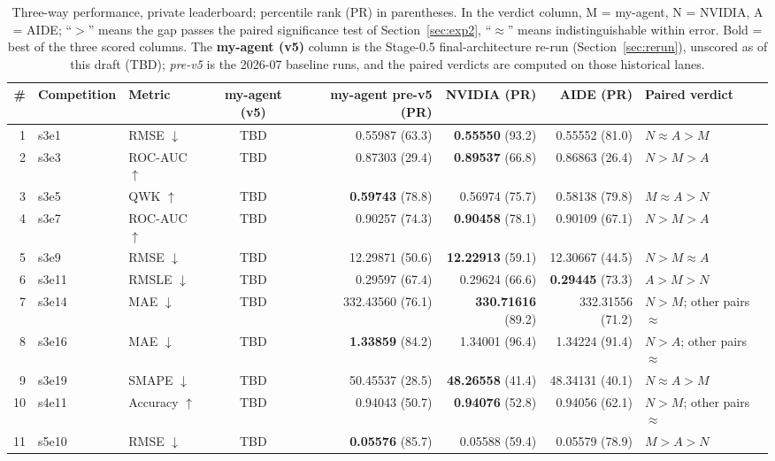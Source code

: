 \documentclass[11pt,a4paper]{article}
\newcommand{\dn}{\ensuremath{\downarrow}}
\newcommand{\up}{\ensuremath{\uparrow}}
\newcommand{\M}{M}   %
\newcommand{\N}{N}   %
\newcommand{\A}{A}   %
\begin{document}
\begin{table}[htbp]
\centering\footnotesize
\setlength{\tabcolsep}{3.5pt}
\caption{Three-way performance, private leaderboard; percentile rank (PR) in parentheses. In the verdict column, \M{} = my-agent, \N{} = NVIDIA, \A{} = AIDE; ``$>$'' means the gap passes the paired significance test of Section~\ref{sec:exp2}, ``$\approx$'' means indistinguishable within error. Bold = best of the three scored columns. The \textbf{my-agent (v5)} column is the Stage-0.5 final-architecture re-run (Section~\ref{sec:rerun}), unscored as of this draft (TBD); \emph{pre-v5} is the 2026-07 baseline runs, and the paired verdicts are computed on those historical lanes.}
\label{tab:private}
\begin{tabular}{@{}rllcrrrl@{}}
\toprule
\# & \textbf{Competition} & \textbf{Metric} & \textbf{my-agent (v5)} & \textbf{my-agent pre-v5 (PR)} & \textbf{NVIDIA (PR)} & \textbf{AIDE (PR)} & \textbf{Paired verdict} \\
\midrule
1 & s3e1 & RMSE \dn & TBD & 0.55987 (63.3) & \textbf{0.55550} (93.2) & 0.55552 (81.0) & $\N \approx \A > \M$ \\
2 & s3e3 & ROC-AUC \up & TBD & 0.87303 (29.4) & \textbf{0.89537} (66.8) & 0.86863 (26.4) & $\N > \M > \A$ \\
3 & s3e5 & QWK \up & TBD & \textbf{0.59743} (78.8) & 0.56974 (75.7) & 0.58138 (79.8) & $\M \approx \A > \N$ \\
4 & s3e7 & ROC-AUC \up & TBD & 0.90257 (74.3) & \textbf{0.90458} (78.1) & 0.90109 (67.1) & $\N > \M > \A$ \\
5 & s3e9 & RMSE \dn & TBD & 12.29871 (50.6) & \textbf{12.22913} (59.1) & 12.30667 (44.5) & $\N > \M \approx \A$ \\
6 & s3e11 & RMSLE \dn & TBD & 0.29597 (67.4) & 0.29624 (66.6) & \textbf{0.29445} (73.3) & $\A > \M > \N$ \\
7 & s3e14 & MAE \dn & TBD & 332.43560 (76.1) & \textbf{330.71616} (89.2) & 332.31556 (71.2) & $\N > \M$; other pairs $\approx$ \\
8 & s3e16 & MAE \dn & TBD & \textbf{1.33859} (84.2) & 1.34001 (96.4) & 1.34224 (91.4) & $\N > \A$; other pairs $\approx$ \\
9 & s3e19 & SMAPE \dn & TBD & 50.45537 (28.5) & \textbf{48.26558} (41.4) & 48.34131 (40.1) & $\N \approx \A > \M$ \\
10 & s4e11 & Accuracy \up & TBD & 0.94043 (50.7) & \textbf{0.94076} (52.8) & 0.94056 (62.1) & $\N > \M$; other pairs $\approx$ \\
11 & s5e10 & RMSE \dn & TBD & \textbf{0.05576} (85.7) & 0.05588 (59.4) & 0.05579 (78.9) & $\M > \A > \N$ \\

\end{tabular}
\end{table}
\end{document}
